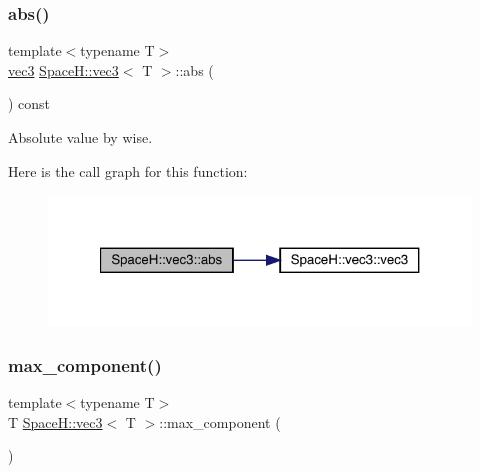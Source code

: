 \subsubsection{\texorpdfstring{abs()}{abs()}\hspace{0.1cm}{\footnotesize\ttfamily [4/4]}}
{\footnotesize\ttfamily template$<$typename T$>$ \\
\mbox{\hyperlink{struct_space_h_1_1vec3}{vec3}} \mbox{\hyperlink{struct_space_h_1_1vec3}{Space\+H\+::vec3}}$<$ T $>$\+::abs (\begin{DoxyParamCaption}{ }\end{DoxyParamCaption}) const\hspace{0.3cm}{\ttfamily [inline]}}



Absolute value by wise. 

Here is the call graph for this function\+:
\nopagebreak
\begin{figure}[H]
\begin{center}
\leavevmode
\includegraphics[width=321pt]{struct_space_h_1_1vec3_af82905f49546b9aa03799dcd87bdff0c_cgraph}
\end{center}
\end{figure}
\mbox{\label{struct_space_h_1_1vec3_a5bf7ae47f97a2269748d66933d719bd9}} 
\subsubsection{\texorpdfstring{max\+\_\+component()}{max\_component()}\hspace{0.1cm}{\footnotesize\ttfamily [1/4]}}
{\footnotesize\ttfamily template$<$typename T$>$ \\
T \mbox{\hyperlink{struct_space_h_1_1vec3}{Space\+H\+::vec3}}$<$ T $>$\+::max\+\_\+component (\begin{DoxyParamCaption}{ }\end{DoxyParamCaption})\hspace{0.3cm}{\ttfamily [inline]}}

